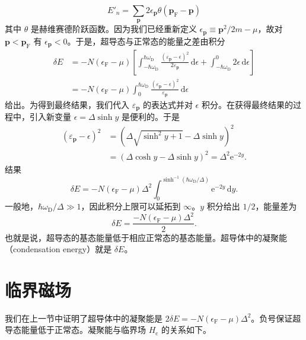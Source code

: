 \begin{equation*}
E'_n=\sum_{\mathbf p}2\epsilon_{\mathbf p}\theta\left(\mathbf p_{\mathrm F}-\mathbf p\right) \tag{12.199}
\end{equation*}
其中 $\theta$ 是赫维赛德阶跃函数。因为我们已经重新定义 $\epsilon_{\mathbf p}\equiv\mathbf p^2/2m-\mu$，故对 $\mathbf p<\mathbf p_{\mathrm F}$ 有 $\epsilon_{\mathbf p}<0$。于是，超导态与正常态的能量之差由积分
\begin{align*}
\delta E&=-N\left(\epsilon_{\mathrm F}-\mu\right)\left[\int_{-\hbar\omega_{\mathrm D}}^{\hbar\omega_{\mathrm D}}\frac{\left(\varepsilon_{\mathbf p}-\epsilon\right)^2}{2\varepsilon_{\mathbf p}}\,\mathrm d\epsilon+\int_{-\hbar\omega_{\mathrm D}}^{0}2\epsilon\,\mathrm d\epsilon\right]\\
&=-N\left(\epsilon_{\mathrm F}-\mu\right)\int_0^{\hbar\omega_{\mathrm D}}\frac{\left(\varepsilon_{\mathbf p}-\epsilon\right)^2}{\varepsilon_{\mathbf p}}\,\mathrm d\epsilon \tag{12.200}
\end{align*}
给出。为得到最终结果，我们代入 $\varepsilon_{\mathbf p}$ 的表达式并对 $\epsilon$ 积分。在获得最终结果的过程中，引入新变量 $\epsilon=\Delta\sinh y$ 是便利的。于是
\begin{align*}
\left(\varepsilon_{\mathbf p}-\epsilon\right)^2&=\left(\Delta\sqrt{\sinh^2 y+1}-\Delta\sinh y\right)^2\\
&=\left(\Delta\cosh y-\Delta\sinh y\right)^2=\Delta^2\mathrm e^{-2y}. \tag{12.201}
\end{align*}
结果
\begin{equation*}
\delta E=-N\left(\epsilon_{\mathrm F}-\mu\right)\Delta^2\int_0^{\sinh^{-1}(\hbar\omega_{\mathrm D}/\Delta)}\mathrm e^{-2y}\,\mathrm d y. \tag{12.202}
\end{equation*}
一般地，$\hbar\omega_{\mathrm D}/\Delta\gg 1$，因此积分上限可以延拓到 $\infty$。$y$ 积分给出 $1/2$，能量差为
\begin{equation*}
\delta E=\frac{-N\left(\epsilon_{\mathrm F}-\mu\right)\Delta^2}{2}. \tag{12.203}
\end{equation*}
也就是说，超导态的基态能量低于相应正常态的基态能量。超导体中的凝聚能（condensation energy）就是 $\delta E$。

\section{临界磁场}

我们在上一节中证明了超导体中的凝聚能是 $2\delta E=-N\left(\epsilon_{\mathrm F}-\mu\right)\Delta^2$。负号保证超导态能量低于正常态。凝聚能与临界场 $H_{\mathrm c}$ 的关系如下。

